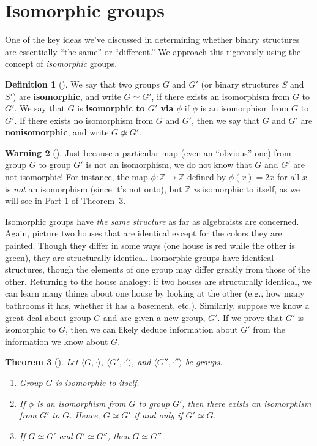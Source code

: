 \documentclass[10pt,]{book}
\newcommand{\terminology}[1]{\textbf{#1}}
\theoremstyle{plain}
\newtheorem{theorem}{Theorem}[section]
\theoremstyle{definition}
\newtheorem{definition}[theorem]{Definition}
\theoremstyle{definition}
\newtheorem{warning}[theorem]{Warning}
\theoremstyle{definition}
\theoremstyle{definition}
\numberwithin{equation}{section}
\def\Z{\mathbb{Z}}
\begin{document}
\section[{Isomorphic groups}]{Isomorphic groups}\label{section-12}
One of the key ideas we've discussed in determining whether binary structures are essentially ``the same'' or ``different.'' We approach this rigorously using the concept of \emph{isomorphic} groups.%
\begin{definition}[{}]\label{definition-32}
We say that two groups \(G\) and \(G'\) (or binary structures \(S\) and \(S'\)) are \terminology{isomorphic}, and write \(G\simeq G'\), if there exists an isomorphism from \(G\) to \(G'\). We say that \(G\) is \terminology{isomorphic to \(G'\) via \(\phi\)} if \(\phi\) is an isomorphism from \(G\) to \(G'\). If there exists no isomorphism from \(G\) and \(G'\), then we say that \(G\) and \(G'\) are \terminology{nonisomorphic}, and write \(G\not\simeq G'\).%
\end{definition}
\begin{warning}[]\label{warning-15}
Just because a particular map (even an ``obvious'' one) from group \(G\) to group \(G'\) is not an isomorphism, we do not know that \(G\) and \(G'\) are not isomorphic! For instance, the map \(\phi: \Z\to \Z\) defined by \(\phi(x)=2x\) for all \(x\) is \emph{not} an isomorphism (since it's not onto), but \(\Z\) \emph{is} isomorphic to itself, as we will see in Part 1 of \hyperref[groupisoequiv]{Theorem~\ref{groupisoequiv}}.%
\end{warning}
Isomorphic groups have \emph{the same structure} as far as algebraists are concerned. Again, picture two houses that are identical except for the colors they are painted. Though they differ in some ways (one house is red while the other is green), they are structurally identical. Isomorphic groups have identical structures, though the elements of one group may differ greatly from those of the other. Returning to the house analogy: if two houses are structurally identical, we can learn many things about one house by looking at the other (e.g., how many bathrooms it has, whether it has a basement, etc.). Similarly, suppose we know a great deal about group \(G\) and are given a new group, \(G'\). If we prove that \(G'\) is isomorphic to \(G\), then we can likely deduce information about \(G'\) from the information we know about \(G\).%
\begin{theorem}[{}]\label{groupisoequiv}
Let \(\langle G,\cdot\rangle\), \(\langle G',\cdot'\rangle\), and \(\langle G'',\cdot''\rangle\) be groups. \leavevmode%
\begin{enumerate}
\item\hypertarget{li-135}{}Group \(G\) is isomorphic to itself.%
\item\hypertarget{li-136}{}If \(\phi\) is an isomorphism from \(G\) to group \(G'\), then there exists an isomorphism from \(G'\) to \(G\). Hence, \(G\simeq G'\) if and only if \(G'\simeq G\).%
\item\hypertarget{li-137}{}If \(G\simeq G'\) and \(G'\simeq G''\), then \(G\simeq G''\).%
\end{enumerate}
%
\end{theorem}
\end{document}
